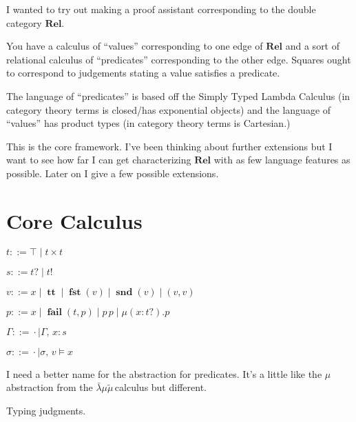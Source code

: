 \documentclass[twocolumn, fleqn]{scrartcl}
\newcommand{\Rel}{\textbf{Rel}}
\newcommand{\lk}{\(\bar{\lambda}\mu\tilde{\mu}\,\)}
\newcommand{\bnfdef}{\mathbin{::=}}
\DeclareMathOperator{\coin}{\textbf{tt}}
\DeclareMathOperator{\fst}{\textbf{fst}}
\DeclareMathOperator{\snd}{\textbf{snd}}
\DeclareMathOperator{\fail}{\textbf{fail}}
\begin{document}
I wanted to try out making a proof assistant corresponding to the
double category \(\Rel\).

You have a calculus of ``values'' corresponding to one edge of
\(\Rel\) and a sort of relational calculus of ``predicates''
corresponding to the other edge. Squares ought to correspond to
judgements stating a value satisfies a predicate.

The language of ``predicates'' is based off the Simply Typed Lambda
Calculus (in category theory terms is closed/has exponential objects)
and the language of ``values'' has product types (in category theory
terms is Cartesian.)

This is the core framework.  I've been thinking about further
extensions but I want to see how far I can get characterizing
\(\Rel\) with as few language features as possible.  Later on I
give a few possible extensions.


\section*{Core Calculus}

\begin{description}[nosep]
\item[Types] \hfill \( t \bnfdef \top \mid t \times t \)
\item[Sorts] \hfill \( s \bnfdef t ? \mid t ! \)
\item[Values] \hfill \( v \bnfdef x \mid \coin \mid \fst(v) \mid \snd(v) \mid ( v , v ) \)
\item[Predicates] \hfill \( p \bnfdef x \mid \fail(t, p) \mid p \, p \mid \mu (x \colon t ?) . p \)
\item[Environment] \hfill \( \Gamma \bnfdef \cdot \mid \Gamma , \, x \colon s  \)
\item[Substitutions] \hfill \( \sigma \bnfdef \cdot \mid \sigma , \, v \models x  \)
\end{description}

I need a better name for the abstraction for predicates. It's a little
like the \(\mu\) abstraction from the \lk calculus but
different.

Typing judgments.
\end{document}
